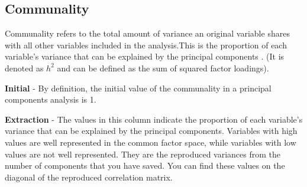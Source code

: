 \documentclass[a4paper,12pt]{article}
\begin{document}
\subsection{Communality} 
Communality refers to the total amount of variance an original variable shares with all other
variables included in the analysis.This is the proportion of each variable's variance that can be explained by the principal components .  (It is denoted as $h^2$ and can be defined as the sum of squared factor loadings).

\textbf{Initial} - By definition, the initial value of the communality in a principal components analysis is 1.

\textbf{Extraction}  - The values in this column indicate the proportion of each variable's variance that can be explained by the principal components.  Variables with high values are well represented in the common factor space, while variables with low values are not well represented. They are the reproduced variances from the number of components that you have saved.  You can find these values on the diagonal of the reproduced correlation matrix.



%
%
%
%
%
%
\end{document}

